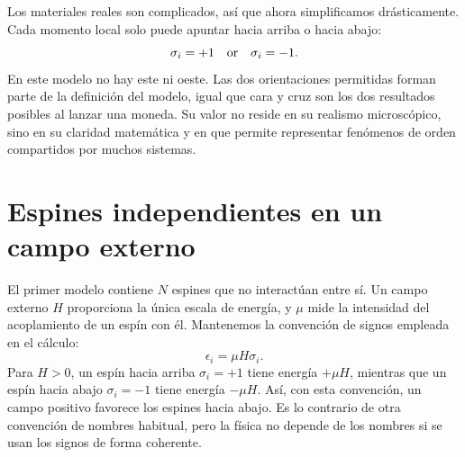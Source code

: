\begin{classroomqa}\end{classroomqa}

Los materiales reales son complicados, así que ahora simplificamos drásticamente. Cada momento local solo puede apuntar hacia arriba o hacia abajo:
\begin{equation}
 \sigma_i=+1\quad\hbox{or}\quad\sigma_i=-1.
 \label{eq:sm8-ising-spin}
\end{equation}
En este modelo no hay este ni oeste. Las dos orientaciones permitidas forman parte de la definición del modelo, igual que cara y cruz son los dos resultados posibles al lanzar una moneda. Su valor no reside en su realismo microscópico, sino en su claridad matemática y en que permite representar fenómenos de orden compartidos por muchos sistemas.

\begin{classroomqa}\end{classroomqa}

\section{Espines independientes en un campo externo}

El primer modelo contiene \(N\) espines que no interactúan entre sí. Un campo externo \(H\) proporciona la única escala de energía, y \(\mu\) mide la intensidad del acoplamiento de un espín con él. Mantenemos la convención de signos empleada en el cálculo:
\begin{equation}
 \epsilon_i=\mu H\sigma_i.
 \label{eq:sm8-single-spin-energy}
\end{equation}
Para \(H>0\), un espín hacia arriba \(\sigma_i=+1\) tiene energía \(+\mu H\), mientras que un espín hacia abajo \(\sigma_i=-1\) tiene energía \(-\mu H\). Así, con esta convención, un campo positivo favorece los espines hacia abajo. Es lo contrario de otra convención de nombres habitual, pero la física no depende de los nombres si se usan los signos de forma coherente.

